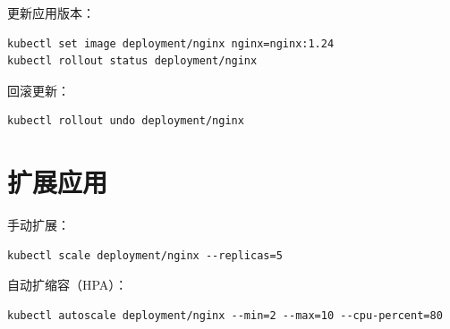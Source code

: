 \documentclass[12pt,UTF8]{ctexbook}
\begin{document}
更新应用版本：
\begin{lstlisting}
kubectl set image deployment/nginx nginx=nginx:1.24
kubectl rollout status deployment/nginx
\end{lstlisting}

回滚更新：
\begin{lstlisting}
kubectl rollout undo deployment/nginx
\end{lstlisting}

\section{扩展应用}
\label{sec:scale_app}

手动扩展：
\begin{lstlisting}
kubectl scale deployment/nginx --replicas=5
\end{lstlisting}

自动扩缩容（HPA）：
\begin{lstlisting}
kubectl autoscale deployment/nginx --min=2 --max=10 --cpu-percent=80
\end{lstlisting}

\backmatter
\end{document}
